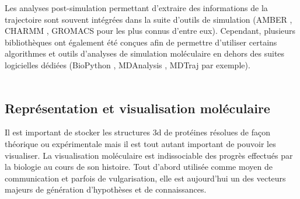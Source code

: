 Les analyses post-simulation permettant d'extraire des informations de la trajectoire sont souvent intégrées dans la suite d'outils de simulation (AMBER \cite{pearlman1995amber}, CHARMM \cite{brooks2009charmm}, GROMACS \cite{pronk2013gromacs} pour les plus connus d'entre eux). Cependant, plusieurs bibliothèques ont également été conçues afin de permettre d'utiliser certains algorithmes et outils d'analyses de simulation moléculaire en dehors des suites logicielles dédiées (BioPython \cite{cock_biopython:_2009}, MDAnalysis \cite{michaud-agrawal_mdanalysis:_2011}, MDTraj \cite{McGibbon2014MDTraj} par exemple).
\\
\\



\subsection{Représentation et visualisation moléculaire} \label{visu_molecular}

Il est important de stocker les structures 3d de protéines résolues de façon théorique ou expérimentale mais il est tout autant important de pouvoir les visualiser. La visualisation moléculaire est indissociable des progrès effectués par la biologie au cours de son histoire. Tout d'abord utilisée comme moyen de communication et parfois de vulgarisation, elle est aujourd'hui un des vecteurs majeurs de génération d'hypothèses et de connaissances.

